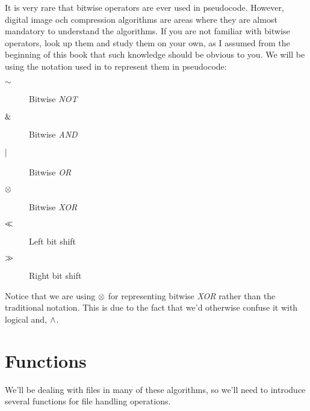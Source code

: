 It is very rare that bitwise operators are ever used in
pseudocode. However, digital image och compression algorithms are
areas where they are almost mandatory to understand the algorithms. If
you are not familiar with bitwise operators, look up them and study
them on your own, as I assumed from the beginning of this book that such
knowledge should be obvious to you. We will be using the notation used
in \C{} to represent them in pseudocode:

\begin{description}
\item[$\mathord{\sim}$] Bitwise \textit{NOT}
\item[$\mathrel{\&}$] Bitwise \textit{AND}
\item[$\mathrel{|}$] Bitwise \textit{OR}
\item[$\mathrel{\otimes}$] Bitwise \textit{XOR}
\item[$\ll$] Left bit shift
\item[$\gg$] Right bit shift
\end{description}

Notice that we are using $\mathrel{\otimes}$ for representing bitwise
\textit{XOR} rather than the traditional \C{} notation. This is due to
the fact that we'd otherwise confuse it with logical and, $\wedge$.

\section{Functions}
\label{sec:pseudocode}

We'll be dealing with files in many of these algorithms, so we'll need
to introduce several functions for file handling operations.

